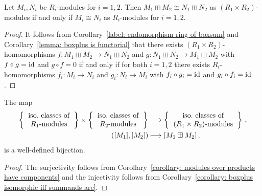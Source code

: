 \begin{corollary}
  \label{corollary: boxplus isomorphic iff summands are}
  Let $M_i, N_i$ be $R_i$-modules for $i = 1, 2$.
  Then $M_1 \boxplus M_2 \cong N_1 \boxplus N_2$ as $(R_1 \times R_2)$-modules if and only if $M_i \cong N_i$ as $R_i$-modules for $i = 1, 2$.
\end{corollary}


\begin{proof}
  It follows from Corollary~\ref{label: endomorphism ring of boxsum} and Corollary~\ref{lemma: boxplus is functorial} that there exists $(R_1 \times R_2)$-homomorphisms $f \colon M_1 \boxplus M_2 \to N_1 \boxplus N_2$ and $g \colon N_1 \boxplus N_2 \to M_1 \boxplus M_2$ with $f \circ g = \operatorname{id}$ and $g \circ f = 0$ if and only if for both $i = 1, 2$ there exists $R_i$-homomorphisms $f_i \colon M_i \to N_i$ and $g_i \colon N_i \to M_i$ with $f_i \circ g_i = \operatorname{id}$ and $g_i \circ f_i = \operatorname{id}$.
\end{proof}


\begin{corollary}
  \label{corollary: isomorphism classes of modules over products}
  The map
  \begin{align*}
    \left\{
      \begin{tabular}{c}
        iso.\ classes of  \\
        $R_1$-modules
      \end{tabular}
    \right\}
    \times
    \left\{
      \begin{tabular}{c}
        iso.\ classes of  \\
        $R_2$-modules
      \end{tabular}
    \right\}
    &\longto
    \left\{
      \begin{tabular}{c}
        iso.\ classes of \\
        $(R_1 \times R_2)$-modules
      \end{tabular}
    \right\} \,,
    \\
    ( [M_1], [M_2] )
    &\longmapsto
    [M_1 \boxplus M_2] \,,
  \end{align*}
  is a well-defined bijection.
\end{corollary}


\begin{proof}
  The surjectivity follows from Corollary~\ref{corollary: modules over products have components} and the injectivity follows from Corollary~\ref{corollary: boxplus isomorphic iff summands are}.
\end{proof}




